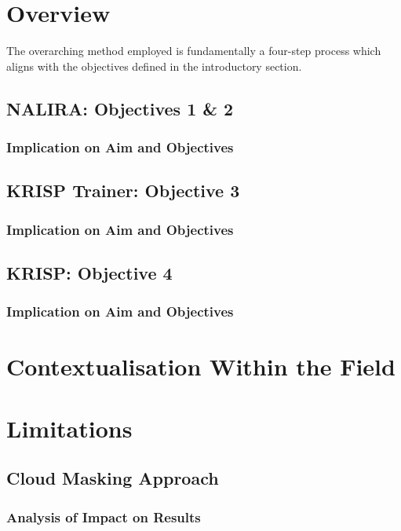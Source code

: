 

\section{Overview}
The overarching method employed is fundamentally a four-step process which aligns with the objectives defined in the introductory section. 

\subsection{NALIRA: Objectives 1 \& 2}
\subsubsection{}
\subsubsection{Implication on Aim and Objectives}

\subsection{KRISP Trainer: Objective 3}
\subsubsection{Implication on Aim and Objectives}

\subsection{KRISP: Objective 4}
\subsubsection{Implication on Aim and Objectives}


\section{Contextualisation Within the Field}


\section{Limitations}
\subsection{Cloud Masking Approach}
\subsubsection{Analysis of Impact on Results}

